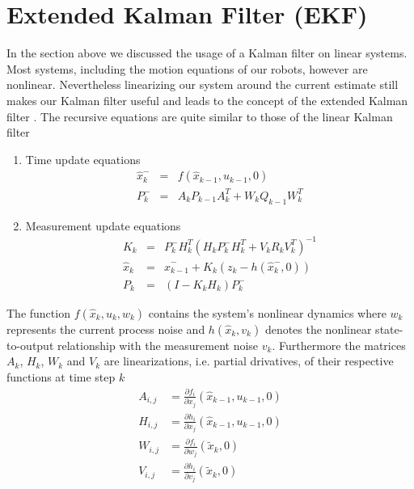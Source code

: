 \section{Extended Kalman Filter (EKF)}

In the section above we discussed the usage of a Kalman filter on linear systems. Most systems, including the motion equations of our robots, however are nonlinear. Nevertheless linearizing our system around the current estimate still makes our Kalman filter useful and leads to the concept of the extended Kalman filter \cite{IntroKF}. The recursive equations are quite similar to those of the linear Kalman filter
\newline
\begin{enumerate}
	\item Time update equations
	\begin{eqnarray}\label{TupEqEKF}
    			\hat{x}_{k}^- &=& f(\hat{x}_{k-1},u_{k-1},0) \\
    			P_{k}^{-} &=& A_kP_{k-1}A_k^T+W_k Q_{k-1} W_k^T
	\end{eqnarray}
	\item Measurement update equations
	\begin{eqnarray}\label{MupEqEKF}
    			K_{k} &=& P_{k}^- H_k^T(H_k P_k^- H_k^T+V_k R_k V_k^T)^{-1} \\
    			\hat{x}_k &=& \hat{x}_{k-1}^- + K_{k}(z_k - h(\hat{x}_k^-, 0)) \\
			P_k &=& (I-K_k H_k)P_k^-
	\end{eqnarray}
\end{enumerate}

The function \(f(\hat{x}_k,u_k,w_k)\) contains the system's nonlinear dynamics where \(w_k\) represents the current process noise and \(h(\hat{x}_k, v_k)\) denotes the nonlinear state-to-output relationship with the measurement noise \(v_k\). Furthermore the matrices \(A_k\), \(H_k\), \(W_k\) and \(V_k\) are linearizations, i.e. partial drivatives, of their respective functions at time step \(k\)
\newline
	\begin{eqnarray}\label{Linearizations}
    			A_{i,j}&= \frac{\partial f_i}{\partial x_j}(\hat{x}_{k-1},u_{k-1},0) \\
    			H_{i,j}&= \frac{\partial h_i}{\partial x_j}(\hat{x}_{k-1},u_{k-1},0) \\
			W_{i,j}&= \frac{\partial f_i}{\partial w_j}(\tilde{x}_k,0) \\
			V_{i,j}&= \frac{\partial h_i}{\partial v_j}(\tilde{x}_k,0)
	\end{eqnarray}

